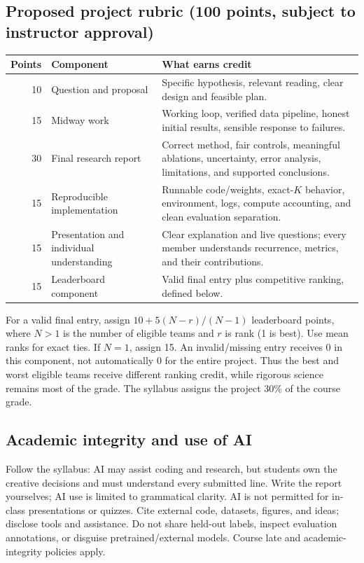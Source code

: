 \documentclass[11pt,letterpaper]{article}
\begin{document}
\subsection{Proposed project rubric (100 points, subject to instructor approval)}
\begin{center}\small
\begin{tabularx}{\linewidth}{@{}r p{1.5in}X@{}}
\toprule
Points & Component & What earns credit\\\midrule
10 & Question and proposal & Specific hypothesis, relevant reading, clear design and feasible plan.\\
15 & Midway work & Working loop, verified data pipeline, honest initial results, sensible response to failures.\\
30 & Final research report & Correct method, fair controls, meaningful ablations, uncertainty, error analysis, limitations, and supported conclusions.\\
15 & Reproducible implementation & Runnable code/weights, exact-$K$ behavior, environment, logs, compute accounting, and clean evaluation separation.\\
15 & Presentation and individual understanding & Clear explanation and live questions; every member understands recurrence, metrics, and their contributions.\\
15 & Leaderboard component & Valid final entry plus competitive ranking, defined below.\\
\bottomrule
\end{tabularx}\end{center}
For a valid final entry, assign $10+5(N-r)/(N-1)$ leaderboard points, where $N>1$ is the number of eligible teams and $r$ is rank (1 is best). Use mean ranks for exact ties. If $N=1$, assign 15. An invalid/missing entry receives 0 in this component, not automatically 0 for the entire project. Thus the best and worst eligible teams receive different ranking credit, while rigorous science remains most of the grade. The syllabus assigns the project 30\% of the course grade.

\subsection{Academic integrity and use of AI}
Follow the syllabus: AI may assist coding and research, but students own the creative decisions and must understand every submitted line. Write the report yourselves; AI use is limited to grammatical clarity. AI is not permitted for in-class presentations or quizzes. Cite external code, datasets, figures, and ideas; disclose tools and assistance. Do not share held-out labels, inspect evaluation annotations, or disguise pretrained/external models. Course late and academic-integrity policies apply.
\end{document}
